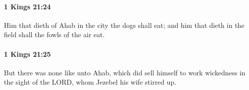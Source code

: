 		\paragraph{1 Kings 21:24} %
			\label{1KINGS-21-24}

			Him that dieth of Ahab in the city the dogs shall eat; and him that dieth in the field shall the fowls of the air eat.


		\paragraph{1 Kings 21:25} %
			\label{1KINGS-21-25}

			But there was none like unto Ahab, which did sell himself to work wickedness in the sight of the LORD, whom Jezebel his wife stirred up.


